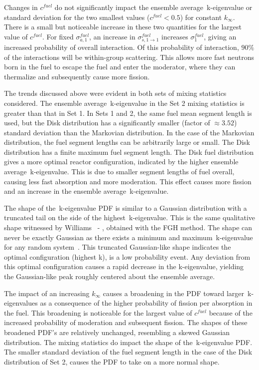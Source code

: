 \noindent
	\indent Changes in 
	${c^{fuel}}$ do not significantly impact the ensemble average~k-eigenvalue or standard
	deviation for the two smallest values (${c^{fuel} < 0.5}$) for constant ${k_{\infty}}$.
	There is a small but noticeable increase in these two quantities for the largest value of
	${c^{fuel}}$.  For fixed ${\sigma_{a,1}^{fuel}}$, an increase 
	in ${\sigma_{s,1\rightarrow1}^{fuel}}$ increases ${\sigma_{1}^{fuel}}$, giving an increased
	probability of overall interaction.  Of this probability of interaction, ${90\%}$ of the interactions
	will be within-group scattering.  This allows more fast neutrons born in the fuel 
	to escape the fuel and enter the moderator, where they can thermalize and subsequently
	cause more fission.
	
\noindent
	\indent The trends discussed above were evident in both sets of mixing statistics considered.
	The ensemble average~k-eigenvalue in the Set 2 mixing statistics is greater than that in
	Set 1.  In Sets 1 and 2, the same fuel mean segment length is used, but the Disk distribution
	has a significantly smaller (factor of ${\approx3.52}$) standard deviation than the Markovian
	distribution.  In the case of the Markovian distribution, the 
	fuel segment lengths can be arbitrarily large or small.  The Disk distribution has a finite
	maximum fuel segment length.  The Disk fuel distribution gives a more optimal reactor
	configuration, indicated by the higher ensemble average~k-eigenvalue.  This is due to smaller 
	segment lengths of fuel overall, causing less fast absorption and more moderation.  This effect
	causes more fission and an increase in the ensemble average~k-eigenvalue. 

\noindent
	\indent The shape of the~k-eigenvalue PDF is similar to a Gaussian distribution with a
	truncated tail on the side of the highest~k-eigenvalue.  This is the same qualitative shape
	witnessed by Williams~\cite{Wil:00a} - \cite{Wil:01}, obtained with the FGH method.  
	The shape can never be exactly Gaussian as there exists a minimum and
	maximum~k-eigenvalue for any random system~\cite{Wil:00a}.  This truncated Gaussian-like
	shape indicates the optimal configuration (highest k), is a low probability event.  Any deviation
	from this optimal configuration causes a rapid decrease in the k-eigenvalue, yielding the
	Gaussian-like peak roughly centered about the ensemble average.

\noindent
	\indent The impact of an increasing ${k_{\infty}}$ causes a broadening in the PDF toward
	larger~k-eigenvalues as a consequence of the higher probability of fission per absorption
	in the fuel.  This 
	broadening is noticeable for the largest value of ${c^{fuel}}$ because of the increased 
	probability of moderation and subsequent fission.  The shapes of these broadened PDF's 
	are relatively unchanged, resembling a skewed Gaussian distribution.
	The mixing statistics do impact the shape of the~k-eigenvalue PDF.  The smaller standard
	deviation of the fuel segment length in the case of the Disk 
	distribution of Set 2, causes the PDF to take on a more normal shape.  

